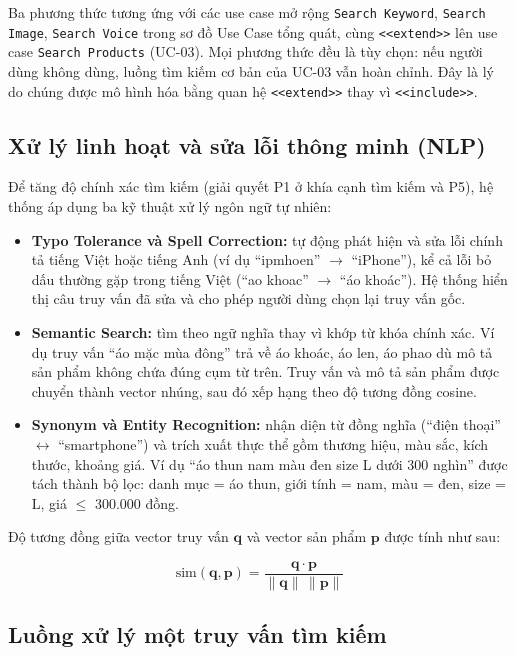 \documentclass[12pt,a4paper,oneside]{report}
\begin{document}
Ba phương thức tương ứng với các use case mở rộng \texttt{Search Keyword}, \texttt{Search Image}, \texttt{Search Voice} trong sơ đồ Use Case tổng quát, cùng \texttt{<<extend>>} lên use case \texttt{Search Products} (UC-03). Mọi phương thức đều là tùy chọn: nếu người dùng không dùng, luồng tìm kiếm cơ bản của UC-03 vẫn hoàn chỉnh. Đây là lý do chúng được mô hình hóa bằng quan hệ \texttt{<<extend>>} thay vì \texttt{<<include>>}.

\subsection{Xử lý linh hoạt và sửa lỗi thông minh (NLP)}

Để tăng độ chính xác tìm kiếm (giải quyết P1 ở khía cạnh tìm kiếm và P5), hệ thống áp dụng ba kỹ thuật xử lý ngôn ngữ tự nhiên:

\begin{itemize}
  \item \textbf{Typo Tolerance và Spell Correction:} tự động phát hiện và sửa lỗi chính tả tiếng Việt hoặc tiếng Anh (ví dụ ``ipmhoen'' $\rightarrow$ ``iPhone''), kể cả lỗi bỏ dấu thường gặp trong tiếng Việt (``ao khoac'' $\rightarrow$ ``áo khoác''). Hệ thống hiển thị câu truy vấn đã sửa và cho phép người dùng chọn lại truy vấn gốc.
  \item \textbf{Semantic Search:} tìm theo ngữ nghĩa thay vì khớp từ khóa chính xác. Ví dụ truy vấn ``áo mặc mùa đông'' trả về áo khoác, áo len, áo phao dù mô tả sản phẩm không chứa đúng cụm từ trên. Truy vấn và mô tả sản phẩm được chuyển thành vector nhúng, sau đó xếp hạng theo độ tương đồng cosine.
  \item \textbf{Synonym và Entity Recognition:} nhận diện từ đồng nghĩa (``điện thoại'' $\leftrightarrow$ ``smartphone'') và trích xuất thực thể gồm thương hiệu, màu sắc, kích thước, khoảng giá. Ví dụ ``áo thun nam màu đen size L dưới 300 nghìn'' được tách thành bộ lọc: danh mục = áo thun, giới tính = nam, màu = đen, size = L, giá $\leq$ 300.000 đồng.
\end{itemize}

Độ tương đồng giữa vector truy vấn $\mathbf{q}$ và vector sản phẩm $\mathbf{p}$ được tính như sau:

\begin{equation}
\text{sim}(\mathbf{q},\mathbf{p}) = \frac{\mathbf{q}\cdot\mathbf{p}}{\lVert\mathbf{q}\rVert\,\lVert\mathbf{p}\rVert}
\end{equation}

\subsection{Luồng xử lý một truy vấn tìm kiếm}
\end{document}
